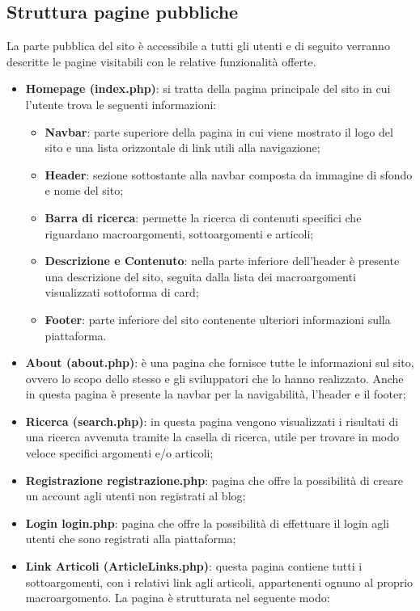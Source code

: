 \documentclass[12pt]{article}
\begin{document}
	\subsection{Struttura pagine pubbliche}
		La parte pubblica del sito è accessibile a tutti gli utenti e di seguito verranno descritte le pagine visitabili con le relative funzionalità offerte.
		\begin{itemize}
				\item \textbf{Homepage (index.php)}: si tratta della pagina principale del sito in cui l'utente trova le seguenti informazioni:
				\begin{itemize}
						\item \textbf{Navbar}: parte superiore della pagina in cui viene mostrato il logo del sito e una lista orizzontale di link utili alla navigazione;
						\item \textbf{Header}: sezione sottostante alla navbar composta da immagine di sfondo e nome del sito;
						\item \textbf{Barra di ricerca}: permette la ricerca di contenuti specifici che riguardano macroargomenti, sottoargomenti e articoli;
						\item \textbf{Descrizione e Contenuto}: nella parte inferiore dell'header è presente una descrizione del sito, seguita dalla lista dei macroargomenti visualizzati sottoforma di card;
						\item \textbf{Footer}: parte inferiore del sito contenente ulteriori informazioni sulla piattaforma.
				\end{itemize}
			\item \textbf{About (about.php)}: è una pagina che fornisce tutte le informazioni sul sito, ovvero lo scopo dello stesso e gli sviluppatori che lo hanno realizzato. Anche in questa pagina è presente la navbar per la navigabilità, l'header e il footer;
			\item \textbf{Ricerca (search.php)}: in questa pagina vengono visualizzati i risultati di una ricerca avvenuta tramite la casella di ricerca, utile per trovare in modo veloce specifici argomenti e/o articoli;
			\item \textbf{Registrazione {registrazione.php}}: pagina che offre la possibilità di creare un account agli utenti non registrati al blog;
			\item \textbf{Login {login.php}}: pagina che offre la possibilità di effettuare il login agli utenti che sono registrati alla piattaforma;
			\item \textbf{Link Articoli (ArticleLinks.php)}: questa pagina contiene tutti i sottoargomenti, con i relativi link agli articoli, appartenenti ognuno al proprio macroargomento. La pagina è strutturata nel seguente modo:

\end{itemize}
\end{document}

